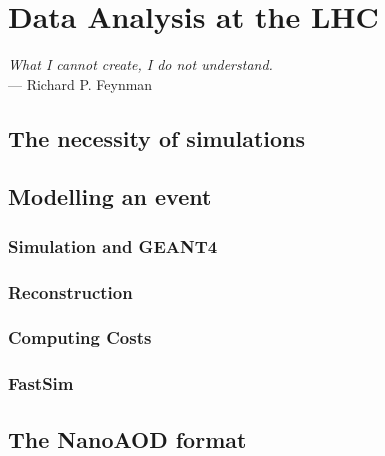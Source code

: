 \chapter{Data Analysis at the LHC}\label{ch:introduction}
\begin{flushright}{\slshape
        What I cannot create, I do not understand.} \\ \medskip
    --- Richard P. Feynman
\end{flushright}

\section{The necessity of simulations}

\section{Modelling an event}

\subsection{Simulation and GEANT4}

\subsection{Reconstruction}

\subsection{Computing Costs}

\subsection{FastSim}

\section{The NanoAOD format}




